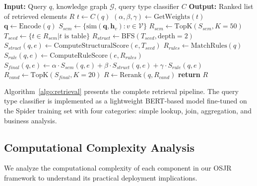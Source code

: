 \documentclass[sigconf, nonatbib]{acmart}
\begin{document}
\begin{algorithm}[t]
    \caption{Joint Retrieval Process}
    \label{algo:retrieval}
    \begin{algorithmic}
    \STATE \textbf{Input:} Query $q$, knowledge graph $\mathcal{G}$, query type classifier $C$
    \STATE \textbf{Output:} Ranked list of retrieved elements $R$
    \STATE
    \STATE {}
    \STATE $t \leftarrow C(q)$ 
    \STATE $(\alpha, \beta, \gamma) \leftarrow \text{GetWeights}(t)$
    \STATE
    \STATE {}
    \STATE $\mathbf{q} \leftarrow \text{Encode}(q)$
    \STATE $S_{sem} \leftarrow \{\text{sim}(\mathbf{q}, \mathbf{h}_v) : v \in \mathcal{V}\}$
    \STATE $R_{sem} \leftarrow \text{TopK}(S_{sem}, K=50)$
    \STATE
    \STATE {}
    \STATE $T_{seed} \leftarrow \{t \in R_{sem} | t \text{ is table}\}$
    \STATE $R_{struct} \leftarrow \text{BFS}(T_{seed}, \text{depth}=2)$ 
    \STATE $S_{struct}(q, e) \leftarrow \text{ComputeStructuralScore}(e, T_{seed})$
    \STATE
    \STATE {}
    \STATE $R_{rules} \leftarrow \text{MatchRules}(q)$
    \STATE $S_{rule}(q, e) \leftarrow \text{ComputeRuleScore}(e, R_{rules})$
    \STATE
    \STATE {}
        \STATE $S_{final}(q, e) \leftarrow \alpha \cdot S_{sem}(q,e) + \beta \cdot S_{struct}(q,e) + \gamma \cdot S_{rule}(q,e)$
    \ENDFOR
    \STATE
    \STATE {}
    \STATE $R_{cand} \leftarrow \text{TopK}(S_{final}, K=20)$
    \STATE $R \leftarrow \text{Rerank}(q, R_{cand})$ 
    \STATE
    \STATE \textbf{return} $R$
    \end{algorithmic}
\end{algorithm}

Algorithm~\ref{algo:retrieval} presents the complete retrieval pipeline. The query type classifier is implemented as a lightweight BERT-based model fine-tuned on the Spider training set with four categories: simple lookup, join, aggregation, and business analysis.

\subsection{Computational Complexity Analysis}

We analyze the computational complexity of each component in our OSJR framework to understand its practical deployment implications.
\end{document}
